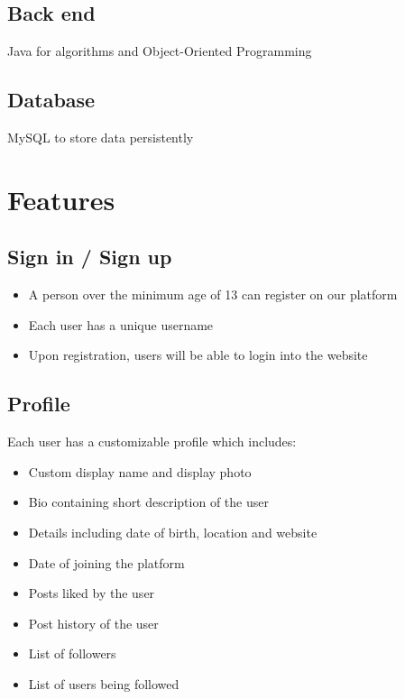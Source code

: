 \documentclass[journal,12pt,onecolumn]{IEEEtran}
\begin{document}
\subsection*{\textbf{Back end}} Java for algorithms and Object-Oriented Programming
\subsection*{\textbf{Database}} MySQL to store data persistently

\section*{\textbf{Features}} 
\subsection*{\textbf{Sign in / Sign up}}
\begin{itemize}
    \item A person over the minimum age of 13 can register on our platform 
    \item Each user has a unique username
    \item Upon registration, users will be able to login into the website
\end{itemize}
%
\subsection*{\textbf{Profile}}
\noindent Each user has a customizable profile which includes:
\begin{itemize}
    \item Custom display name and display photo
    \item Bio containing short description of the user
    \item Details including date of birth, location and website
    \item Date of joining the platform
    \item Posts liked by the user
    \item Post history of the user
    \item List of followers
    \item List of users being followed
\end{itemize}
%
\end{document}
